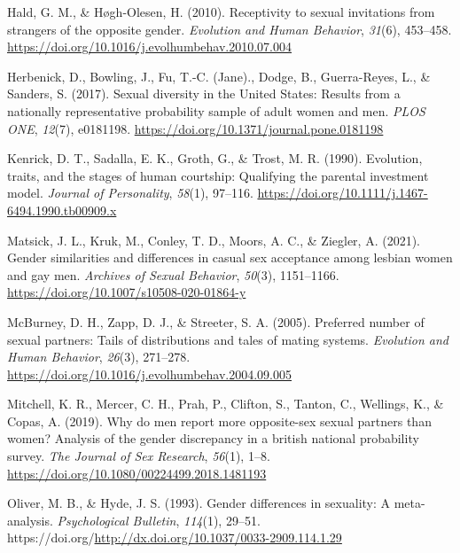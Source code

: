 \documentclass[
  11pt,
]{article}
\newlength{\cslhangindent}
\newlength{\cslentryspacingunit} %
\newenvironment{CSLReferences}[2] %
 {%
  \setlength{\parindent}{0pt}
  \ifodd #1
  \let\oldpar\par
  \def\par{\hangindent=\cslhangindent\oldpar}
  \fi
  \setlength{\parskip}{#2\cslentryspacingunit}
 }%
 {}
\begin{document}
\begin{CSLReferences}{1}{0}
\leavevmode{}%
Hald, G. M., \& Høgh-Olesen, H. (2010). Receptivity to sexual
invitations from strangers of the opposite gender. \emph{Evolution and
Human Behavior}, \emph{31}(6), 453--458.
\url{https://doi.org/10.1016/j.evolhumbehav.2010.07.004}

\leavevmode{}%
Herbenick, D., Bowling, J., Fu, T.-C. (Jane)., Dodge, B., Guerra-Reyes,
L., \& Sanders, S. (2017). Sexual diversity in the {United States}:
Results from a nationally representative probability sample of adult
women and men. \emph{{PLOS} {ONE}}, \emph{12}(7), e0181198.
\url{https://doi.org/10.1371/journal.pone.0181198}

\leavevmode{}%
Kenrick, D. T., Sadalla, E. K., Groth, G., \& Trost, M. R. (1990).
Evolution, traits, and the stages of human courtship: Qualifying the
parental investment model. \emph{Journal of Personality}, \emph{58}(1),
97--116. \url{https://doi.org/10.1111/j.1467-6494.1990.tb00909.x}

\leavevmode{}%
Matsick, J. L., Kruk, M., Conley, T. D., Moors, A. C., \& Ziegler, A.
(2021). Gender similarities and differences in casual sex acceptance
among lesbian women and gay men. \emph{Archives of Sexual Behavior},
\emph{50}(3), 1151--1166.
\url{https://doi.org/10.1007/s10508-020-01864-y}

\leavevmode{}%
McBurney, D. H., Zapp, D. J., \& Streeter, S. A. (2005). Preferred
number of sexual partners: Tails of distributions and tales of mating
systems. \emph{Evolution and Human Behavior}, \emph{26}(3), 271--278.
\url{https://doi.org/10.1016/j.evolhumbehav.2004.09.005}

\leavevmode{}%
Mitchell, K. R., Mercer, C. H., Prah, P., Clifton, S., Tanton, C.,
Wellings, K., \& Copas, A. (2019). Why do men report more opposite-sex
sexual partners than women? Analysis of the gender discrepancy in a
british national probability survey. \emph{The Journal of Sex Research},
\emph{56}(1), 1--8. \url{https://doi.org/10.1080/00224499.2018.1481193}

\leavevmode{}%
Oliver, M. B., \& Hyde, J. S. (1993). Gender differences in sexuality: A
meta-analysis. \emph{Psychological Bulletin}, \emph{114}(1), 29--51.
https://doi.org/\url{http://dx.doi.org/10.1037/0033-2909.114.1.29}


\end{CSLReferences}
\end{document}
